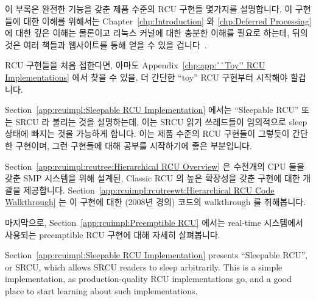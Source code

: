 

이 부록은 완전한 기능을 갖춘 제품 수준의 RCU 구현들 몇가지를 설명합니다.
이 구현들에 대한 이해를 위해서는
Chapter~\ref{chp:Introduction} 와
\ref{chp:Deferred Processing} 에 대한 깊은 이해는 물론이고 리눅스 커널에 대한
충분한 이해를 필요로 하는데, 뒤의 것은 여러 책들과 웹사이트를 통해 얻을 수 있을
겁니다~\cite{BovetCesati2005,CorbetRubiniKroahHartman,CorbetLWN,RobertLove2005}.

RCU 구현들을 처음 접한다면, 아마도
Appendix~\ref{chp:app:``Toy'' RCU Implementations} 에서 찾을 수 있을, 더
간단한 ``toy'' RCU 구현부터 시작해야 할겁니다.
\iffalse

This appendix describes several fully functional production-quality RCU
implementations.
Understanding of these implementations requires a thorough understanding
of the material in
Chapters~\ref{chp:Introduction} and
\ref{chp:Deferred Processing},
as well as a reasonably good understanding of the Linux kernel,
the latter of which may be found in several textbooks and
websites~\cite{BovetCesati2005,CorbetRubiniKroahHartman,CorbetLWN,RobertLove2005}.

If you are new to RCU implementations, you should start with the
simpler ``toy'' RCU implementations that may be found in
Appendix~\ref{chp:app:``Toy'' RCU Implementations}.
\fi

Section~\ref{app:rcuimpl:Sleepable RCU Implementation} 에서는 ``Sleepable RCU''
또는 SRCU 라 불리는 것을 설명하는데, 이는 SRCU 읽기 쓰레드들이 임의적으로 sleep
상태에 빠지는 것을 가능하게 합니다.
이는 제품 수준의 RCU 구현들이 그렇듯이 간단한 구현이며, 그런 구현들에 대해
공부를 시작하기에 좋은 부분입니다.

Section~\ref{app:rcuimpl:rcutree:Hierarchical RCU Overview} 은 수천개의 CPU
들을 갖춘 SMP 시스템을 위해 설계된, Classic RCU 의 높은 확장성을 갖춘 구현에
대한 개괄을 제공합니다.
Section~\ref{app:rcuimpl:rcutreewt:Hierarchical RCU Code Walkthrough} 는 이
구현에 대한 (2008년 경의) 코드의 walkthrough 를 취해봅니다.

마지막으로,
Section~\ref{app:rcuimpl:Preemptible RCU}
에서는 real-time 시스템에서 사용되는 preemptible RCU 구현에 대해 자세히
살펴봅니다.
\iffalse

Section~\ref{app:rcuimpl:Sleepable RCU Implementation} presents
``Sleepable RCU'', or SRCU, which allows SRCU readers to sleep
arbitrarily.
This is a simple implementation, as production-quality RCU implementations
go, and a good place to start learning about such implementations.

